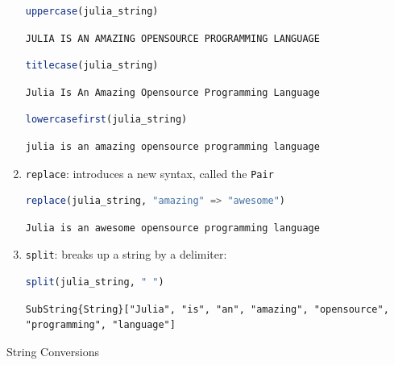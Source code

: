 \documentclass[
  notoc %
]{tufte-book}
\makeatletter
\newcommand{\passthrough}[1]{#1}
\renewcommand\subsubsection{%
\@startsection{subsubsection}{3}{\z@ }{-3.25ex\@plus -1ex \@minus -.2ex}{1.5ex \@plus .2ex}{\normalfont \normalsize \bfseries }
}
\makeatother
\begin{document}
\begin{enumerate}
  \begin{lstlisting}[language=Julia]
  uppercase(julia_string)
  \end{lstlisting}

  \begin{lstlisting}[language=Output]
  JULIA IS AN AMAZING OPENSOURCE PROGRAMMING LANGUAGE
  \end{lstlisting}

  \begin{lstlisting}[language=Julia]
  titlecase(julia_string)
  \end{lstlisting}

  \begin{lstlisting}[language=Output]
  Julia Is An Amazing Opensource Programming Language
  \end{lstlisting}

  \begin{lstlisting}[language=Julia]
  lowercasefirst(julia_string)
  \end{lstlisting}

  \begin{lstlisting}[language=Output]
  julia is an amazing opensource programming language
  \end{lstlisting}
\item
  \passthrough{\lstinline!replace!}: introduces a new syntax, called the
  \passthrough{\lstinline!Pair!}

  \begin{lstlisting}[language=Julia]
  replace(julia_string, "amazing" => "awesome")
  \end{lstlisting}

  \begin{lstlisting}[language=Output]
  Julia is an awesome opensource programming language
  \end{lstlisting}
\item
  \passthrough{\lstinline!split!}: breaks up a string by a delimiter:

  \begin{lstlisting}[language=Julia]
  split(julia_string, " ")
  \end{lstlisting}

  \begin{lstlisting}[language=Output]
  SubString{String}["Julia", "is", "an", "amazing", "opensource", "programming", "language"]
  \end{lstlisting}
\end{enumerate}

\hypertarget{sec:string_conversions}{%
\subsubsection{String Conversions}\label{sec:string_conversions}}
\end{document}
